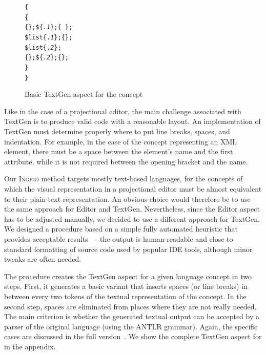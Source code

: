 \begin{figure}[ht]
\begin{alltt}
\small
{}  \{
   \{
     \{\mpstgliteral{<}\};  \$\{.\textit{1}\};  \{\ \};
     \$list\{.\textit{1}\};  \{\mpstgliteral{>}\};
     \$list\{.\textit{2}\};
     \{\mpstgliteral{</}\};  \$\{.\textit{2}\};  \{\mpstgliteral{>}\};
  \}
\}
\end{alltt}
\caption{Basic TextGen aspect for the  concept}
\label{fig:TEXTGENBASIC}
\vspace{-4mm}
\end{figure}

Like in the case of a projectional editor, the main challenge associated with TextGen is to produce valid code with a reasonable layout.
An implementation of TextGen must determine properly where to put line breaks, spaces, and indentation.
For example, in the case of the concept representing an XML element, there must be a space between the element's name and the first attribute, while it is not required between the opening bracket \antlrliteral{\textless} and the name.

Our \textsc{Ingrid} method targets mostly text-based languages, for the concepts of which the visual representation in a projectional editor must be almost equivalent to their plain-text representation.
An obvious choice would therefore be to use the same approach for Editor and TextGen.
Nevertheless, since the Editor aspect has to be adjusted manually, we decided to use a different approach for TextGen.
We designed a procedure based on a simple fully automated heuristic that provides acceptable results --- the output is human-readable and close to standard formatting of source code used by popular IDE tools, although minor tweaks are often needed.

The procedure creates the TextGen aspect for a given language concept in two steps.
First, it generates a basic variant that inserts spaces (or line breaks) in between every two tokens of the textual representation of the concept.
In the second step, spaces are eliminated from places where they are not really needed.
The main criterion is whether the generated textual output can be accepted by a parser of the original language (using the ANTLR grammar).
Again, the specific cases are discussed in the full version~\cite{ref:TRFULL}.
We show the complete TextGen aspect for  in the appendix.

